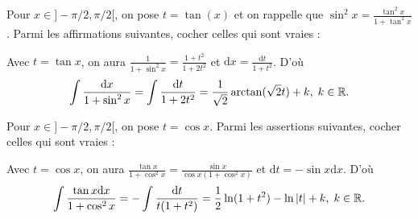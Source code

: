 \begin{question}
Pour $x\in ]-\pi/2,\pi/2[$, on pose $t=\tan (x)$ et on rappelle que $\displaystyle \sin ^2x=\frac{\tan ^2x}{1+\tan ^2x}$. Parmi les affirmations suivantes, cocher celles qui sont vraies :
\begin{answers}  
\good{Sur $]-\pi/2,\pi/2[$, on a : $\displaystyle \int \frac{\mathrm{d}x}{1+\sin ^2x}=\frac{1}{\sqrt{2}}\arctan\left(\sqrt{2}\tan x\right)+k$, $k\in \Rr$.}
\end{answers}
\vskip2mm
\begin{explanations}
Avec $t=\tan x$, on aura $\displaystyle \frac{1}{1+\sin ^2x}=\frac{1+t^2}{1+2t^2}$ et $\displaystyle \mathrm{d}x=\frac{\mathrm{d}t}{1+t^2}$. D'où
$$\int \frac{\mathrm{d}x}{1+\sin ^2x}=\int \frac{\mathrm{d}t}{1+2t^2}=\frac{1}{\sqrt{2}}\arctan(\sqrt{2}t)+k,\; k\in \mathbb{R}.$$
\end{explanations}
\end{question}

\begin{question}
Pour $x\in ]-\pi/2,\pi/2[$, on pose $t=\cos x$. Parmi les assertions suivantes, cocher celles qui sont vraies :
\begin{answers}  
\good{Sur $]-\pi/2,\pi/2[$, on a : $\displaystyle \int \frac{\tan x\, \mathrm{d}x}{1+\cos ^2x}=\ln \left(\frac{\sqrt{1+\cos ^2x}}{\cos x}\right)+k$, $k\in \Rr$.}
\end{answers}
\vskip2mm
\begin{explanations}
Avec $t=\cos x$, on aura $\displaystyle \frac{\tan x}{1+\cos ^2x}=\frac{\sin x}{\cos x(1+\cos ^2x)}$ et $\displaystyle \mathrm{d}t=-\sin x\mathrm{d}x$. D'où
$$\int \frac{\tan x\mathrm{d}x}{1+\cos ^2x}=-\int \frac{\mathrm{d}t}{t(1+t^2)}=\frac{1}{2}\ln (1+t^2)-\ln |t|+k,\; k\in \mathbb{R}.$$
\end{explanations}
\end{question}


